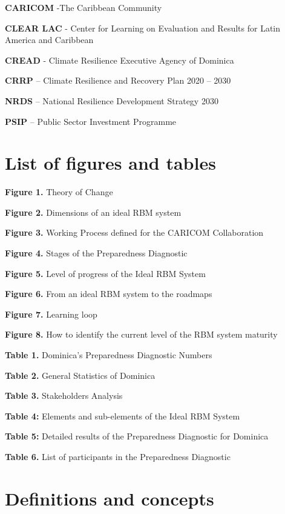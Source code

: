 \documentclass[
]{book}
\begin{document}
\textbf{CARICOM} -The Caribbean Community

\textbf{CLEAR LAC} - Center for Learning on Evaluation and Results for Latin America and Caribbean

\textbf{CREAD} - Climate Resilience Executive Agency of Dominica

\textbf{CRRP} -- Climate Resilience and Recovery Plan 2020 -- 2030

\textbf{NRDS} -- National Resilience Development Strategy 2030

\textbf{PSIP} -- Public Sector Investment Programme

\hypertarget{list-of-figures-and-tables}{%
\chapter*{List of figures and tables}\label{list-of-figures-and-tables}}

\textbf{Figure 1.} Theory of Change

\textbf{Figure 2.} Dimensions of an ideal RBM system

\textbf{Figure 3.} Working Process defined for the CARICOM Collaboration

\textbf{Figure 4.} Stages of the Preparedness Diagnostic

\textbf{Figure 5.} Level of progress of the Ideal RBM System

\textbf{Figure 6.} From an ideal RBM system to the roadmaps

\textbf{Figure 7.} Learning loop

\textbf{Figure 8.} How to identify the current level of the RBM system maturity

\textbf{Table 1.} Dominica's Preparedness Diagnostic Numbers

\textbf{Table 2.} General Statistics of Dominica

\textbf{Table 3.} Stakeholders Analysis

\textbf{Table 4:} Elements and sub-elements of the Ideal RBM System

\textbf{Table 5:} Detailed results of the Preparedness Diagnostic for Dominica

\textbf{Table 6.} List of participants in the Preparedness Diagnostic

\hypertarget{definitions-and-concepts}{%
\chapter*{Definitions and concepts}\label{definitions-and-concepts}}
\end{document}
